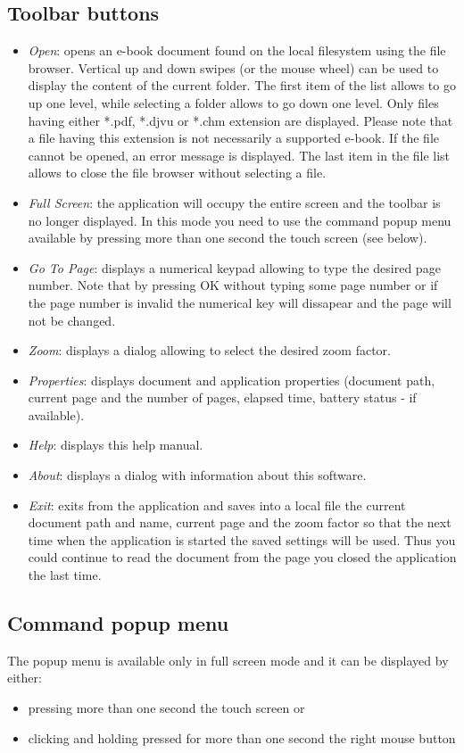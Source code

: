 \documentclass[journal,12pt]{IEEEtran}
\begin{document}
\subsection{Toolbar buttons}
\begin{itemize}
 \item \textit{Open}: opens an e-book document found on the local filesystem using the file browser. Vertical up and down swipes (or the mouse wheel) can be used to display the content of the current folder. The first item of the list allows to go up one level, while selecting a folder allows to go down one level. Only files having either *.pdf, *.djvu or *.chm extension are displayed. Please note that a file having this extension is not necessarily a supported e-book. If the file cannot be opened, an error message is displayed. The last item in the file list allows to close the file browser without selecting a file.
 \item \textit{Full Screen}: the application will occupy the entire screen and the toolbar is no longer displayed. In this mode you need to use the command popup menu available by pressing more than one second the touch screen (see below).
 \item \textit{Go To Page}: displays a numerical keypad allowing to type the desired page number. Note that by pressing OK without typing some page number or if the page number is invalid the numerical key will dissapear and the page will not be changed.
 \item \textit{Zoom}: displays a dialog allowing to select the desired zoom factor.
 \item \textit{Properties}: displays document and application properties (document path, current page and the number of pages, elapsed time, battery status - if available).
 \item \textit{Help}: displays this help manual.
 \item \textit{About}: displays a dialog with information about this software.
 \item \textit{Exit}: exits from the application and saves into a local file the current document path and name, current page and the  zoom factor so that the next time when the application is started the saved settings will be used. Thus you could continue to read the document from the page you closed the application the last time.
\end{itemize}

\subsection{Command popup menu}
The popup menu is available only in full screen mode and it can be displayed by either:
\begin{itemize}
 \item pressing more than one second the touch screen or
 \item clicking and holding pressed for more than one second the right mouse button
\end{itemize}
\end{document}
